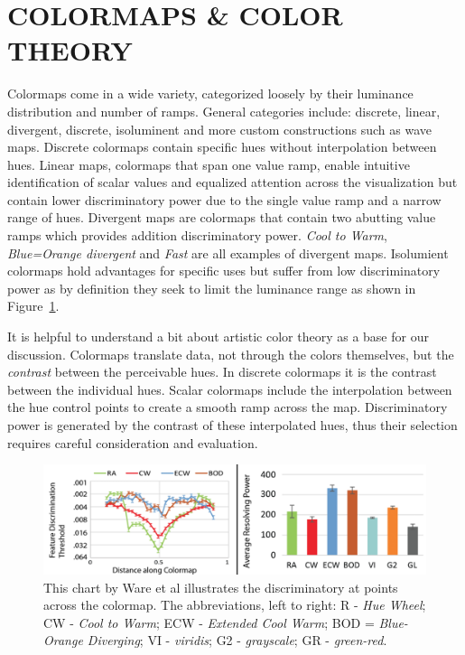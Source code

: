 \documentclass{IEEEcsmag}
\newcommand*{\colormap}[1]{\textsl{#1}\xspace}
\newcommand*{\huewheel}{\colormap{Hue Wheel}}
\newcommand*{\coolwarm}{\colormap{Cool to Warm}}
\newcommand*{\blueorange}{\colormap{Blue-Orange Diverging}}
\newcommand*{\fast}{\colormap{Fast}}
\begin{document}
\section {COLORMAPS \& COLOR THEORY}
Colormaps come in a wide variety, categorized loosely by their luminance distribution and number  of ramps. 
General categories include: discrete, linear, divergent, discrete, isoluminent and more custom constructions such as wave maps. Discrete colormaps contain specific hues without interpolation between hues. Linear maps, colormaps that span one value ramp, enable intuitive identification of scalar values and equalized attention across the visualization but contain lower discriminatory power due to the single value ramp and a narrow range of hues. Divergent maps are colormaps that contain two abutting value ramps which provides addition discriminatory power. \coolwarm, \textit{Blue=Orange divergent} and \fast are all examples of divergent maps. Isolumient colormaps hold advantages for specific uses but suffer from low discriminatory power as by definition they seek to limit the luminance range as shown in Figure~\ref{Ware}.

It is helpful to understand a bit about artistic color theory \cite{Itten} as a base for our discussion. Colormaps translate data, not through the colors themselves, but the \textit{contrast} between the perceivable hues. In discrete colormaps it is the contrast between the individual hues. Scalar colormaps include the interpolation between the hue control points to create a smooth ramp across the map. Discriminatory power is generated by the contrast of these interpolated hues, thus their selection requires careful consideration and evaluation.

\begin{figure}
\includegraphics[width=\linewidth]{pics/Ware17.png}
\caption{This chart by Ware et al \cite{Ware2019} illustrates the discriminatory at points across the colormap. The abbreviations, left to right: R - \huewheel; CW - \coolwarm; ECW - \textit{Extended Cool Warm}; BOD = \blueorange; VI - \textit{viridis}; G2 - \textit{grayscale}; GR - \textit{green-red}. }
\label{Ware}
\end{figure}
\end{document}
